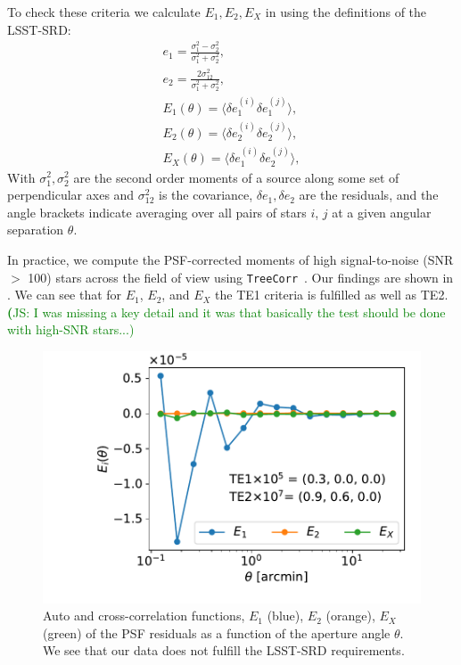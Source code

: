 \documentclass[twocolumn]{aastex62}
\newcommand{\js}[1]{{\textcolor{green}{{\textbf (JS: #1)}}}}
\begin{document}
To check these criteria we calculate $E_{1}, E_{2}, E_{X}$ in using the definitions of the LSST-SRD:
\begin{eqnarray}
e_{1} = \frac{\sigma^{2}_{1} - \sigma^{2}_{2}}{\sigma_{1}^{2}+\sigma_{2}^{2}},\\
e_{2} = \frac{2\sigma^{2}_{12}}{\sigma_{1}^{2}+\sigma_{2}^{2}},\\
E_{1} (\theta) = \langle \delta e^{(i)}_{1}\delta e^{(j)}_{1} \rangle,\\
E_{2} (\theta) = \langle \delta e^{(i)}_{2}\delta e^{(j)}_{2} \rangle,\\
E_{X} (\theta) = \langle \delta e^{(i)}_{1}\delta e^{(j)}_{2} \rangle,
\end{eqnarray}
With $\sigma_{1}^{2}, \sigma_{2}^{2}$ are the second order moments of a source along some set of perpendicular axes and $\sigma^{2}_{12}$ is the covariance, $\delta e_{1}, \delta e_{2}$ are the residuals, and the angle brackets indicate averaging over all pairs of stars $i$, $j$ at a given angular separation $\theta$.

In practice, we compute the PSF-corrected moments of high signal-to-noise (SNR $>$ 100) stars across the field of view using \texttt{TreeCorr}~\citep{2004MNRAS.352..338J}. Our findings are shown in . We can see that for $E_{1}$, $E_{2}$, and $E_{X}$ the TE1 criteria is fulfilled as well as TE2. 
\js{I was missing a key detail and it was that basically the test should be done with high-SNR stars...}
\begin{figure}
\centering
\includegraphics[width=0.9\columnwidth]{TEx}
\caption{Auto and cross-correlation functions, $E_{1}$ (blue), $E_{2}$ (orange), $E_{X}$ (green) of the PSF residuals as a function of the aperture angle $\theta$. We see that our data does not fulfill the LSST-SRD requirements.}
\label{fig:TEx}
\end{figure}
\end{document}
